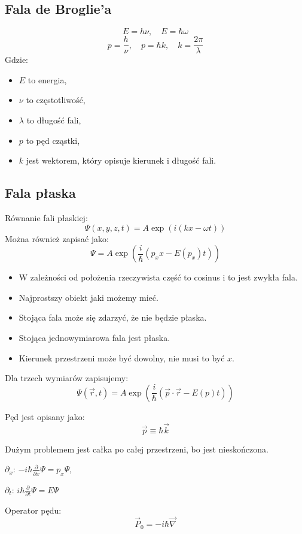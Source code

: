 \subsection{Fala de Broglie'a}
\[
E = h\nu, \quad E = \hbar \omega
\]
\[
p = \frac{h}{\nu}, \quad p = \hbar k, \quad k = \frac{2\pi}{\lambda}
\]
Gdzie:
\begin{itemize}
    \item $E$ to energia,
    \item $\nu$ to częstotliwość,
    \item $\lambda$ to długość fali,
    \item $p$ to pęd cząstki,
    \item $k$ jest wektorem, który opisuje kierunek i długość fali.
\end{itemize}

\subsection{Fala płaska}
Równanie fali płaskiej:
\[
\Psi(x,y,z,t) = A \exp \left( i \left( kx - \omega t \right) \right)
\]
Można również zapisać jako:
\[
\Psi = A \exp \left( \frac{i}{\hbar} (p_x x - E(p_x) t) \right)
\]
\begin{itemize}
    \item W zależności od położenia rzeczywista część to cosinus i to jest zwykła fala.
    \item Najprostszy obiekt jaki możemy mieć.
    \item Stojąca fala może się zdarzyć, że nie będzie płaska.
    \item Stojąca jednowymiarowa fala jest płaska.
    \item Kierunek przestrzeni może być dowolny, nie musi to być $x$.
\end{itemize}

Dla trzech wymiarów zapisujemy:
\[
\Psi(\vec{r}, t) = A \exp \left( \frac{i}{\hbar} (\vec{p} \cdot \vec{r} - E(p) t) \right)
\]

Pęd jest opisany jako:
\[
\vec{p} \equiv \hbar \vec{k}
\]

Dużym problemem jest całka po całej przestrzeni, bo jest nieskończona.

$\partial_x$: $-i\hbar \frac{\partial}{\partial x} \Psi = p_x \Psi$,

$\partial_t$: $i\hbar \frac{\partial}{\partial t} \Psi = E \Psi$

Operator pędu:
\[
\vec{P}_0 = -i\hbar \vec{\nabla}
\]

